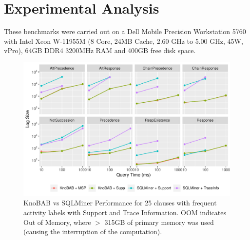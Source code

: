 
\section{Experimental Analysis}\label{sec:exp}
These benchmarks were carried out on a Dell Mobile Precision Workstation 5760 with 
Intel Xeon W-11955M (8 Core, 24MB Cache, 2.60 GHz to 5.00 GHz, 45W, vPro), 64GB DDR4 3200MHz RAM and 400GB free disk space.
\begin{figure}[!t]
	\centering
	\includegraphics[width=.8\textwidth]{images/Rplot.pdf}
	\caption{KnoBAB vs SQLMiner Performance for 25  clauses with frequent activity labels with Support and Trace Information. OOM indicates Out of Memory, where $>$ 315GB of primary memory was used (causing the interruption of the computation).}\label{fig:vsSQL}
\end{figure}

